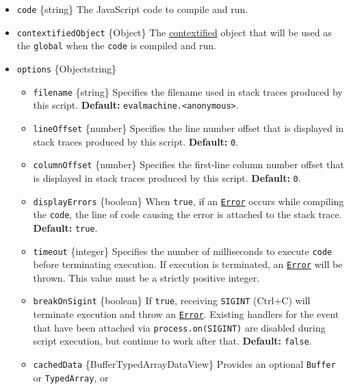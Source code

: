 \begin{itemize}
\tightlist
\item
  \texttt{code} \{string\} The JavaScript code to compile and run.
\item
  \texttt{contextifiedObject} \{Object\} The
  \hyperref[what-does-it-mean-to-contextify-an-object]{contextified}
  object that will be used as the \texttt{global} when the \texttt{code}
  is compiled and run.
\item
  \texttt{options} \{Object\textbar string\}

  \begin{itemize}
  \tightlist
  \item
    \texttt{filename} \{string\} Specifies the filename used in stack
    traces produced by this script. \textbf{Default:}
    \texttt{\textquotesingle{}evalmachine.\textless{}anonymous\textgreater{}\textquotesingle{}}.
  \item
    \texttt{lineOffset} \{number\} Specifies the line number offset that
    is displayed in stack traces produced by this script.
    \textbf{Default:} \texttt{0}.
  \item
    \texttt{columnOffset} \{number\} Specifies the first-line column
    number offset that is displayed in stack traces produced by this
    script. \textbf{Default:} \texttt{0}.
  \item
    \texttt{displayErrors} \{boolean\} When \texttt{true}, if an
    \href{errors.md\#class-error}{\texttt{Error}} occurs while compiling
    the \texttt{code}, the line of code causing the error is attached to
    the stack trace. \textbf{Default:} \texttt{true}.
  \item
    \texttt{timeout} \{integer\} Specifies the number of milliseconds to
    execute \texttt{code} before terminating execution. If execution is
    terminated, an \href{errors.md\#class-error}{\texttt{Error}} will be
    thrown. This value must be a strictly positive integer.
  \item
    \texttt{breakOnSigint} \{boolean\} If \texttt{true}, receiving
    \texttt{SIGINT} (Ctrl+C) will terminate execution and throw an
    \href{errors.md\#class-error}{\texttt{Error}}. Existing handlers for
    the event that have been attached via
    \texttt{process.on(\textquotesingle{}SIGINT\textquotesingle{})} are
    disabled during script execution, but continue to work after that.
    \textbf{Default:} \texttt{false}.
  \item
    \texttt{cachedData} \{Buffer\textbar TypedArray\textbar DataView\}
    Provides an optional \texttt{Buffer} or \texttt{TypedArray}, or

\end{itemize}
\end{itemize}
